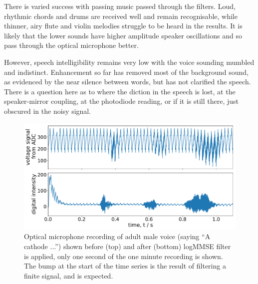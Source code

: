 \documentclass[prb,preprint]{revtex4-1}
\begin{document}
There is varied success with passing music passed through the filters. Loud, rhythmic chords and drums are received well and remain recognisable, while thinner, airy flute and violin melodies struggle to be heard in the results. It is likely that the lower sounds have higher amplitude speaker oscillations and so pass through the optical microphone better.


However, speech intelligibility remains very low with the voice sounding mumbled and indistinct. Enhancement so far has removed most of the background sound, as evidenced by the near silence between words, but has not clarified the speech. There is a question here as to where the diction in the speech is lost, at the speaker-mirror coupling, at the photodiode reading, or if it is still there, just obscured in the noisy signal.


\begin{figure}%
	\includegraphics[width=\textwidth]{figures/filter_timeseries_aa_melatos-cropped.pdf}
	\caption{Optical microphone recording of adult male voice (saying ``A cathode ...'') shown before (top) and after (bottom) logMMSE filter is applied, only one second of the one minute recording is shown. The bump at the start of the time series is the result of filtering a finite signal, and is expected.}
	\label{fig:logMMSE_timeseries}
\end{figure}
\end{document}
